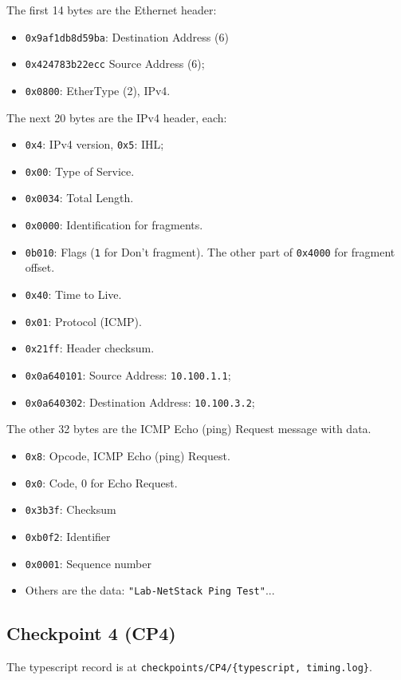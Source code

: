 \documentclass[a4paper]{article}
\begin{document}
  The first 14 bytes are the Ethernet header:
  \begin{itemize}
    \item \texttt{0x9af1db8d59ba}: Destination Address (6)
    \item \texttt{0x424783b22ecc} Source Address (6);
    \item \texttt{0x0800}: EtherType (2), IPv4.
  \end{itemize}
  The next 20 bytes are the IPv4 header, each:
  \begin{itemize}
    \item \texttt{0x4}: IPv4 version, \texttt{0x5}: IHL;
    \item \texttt{0x00}: Type of Service.
    \item \texttt{0x0034}: Total Length.
    \item \texttt{0x0000}: Identification for fragments.
    \item \texttt{0b010}: Flags (\texttt{1} for Don't fragment). The other part of \texttt{0x4000} for fragment offset.
    \item \texttt{0x40}: Time to Live.
    \item \texttt{0x01}: Protocol (ICMP).
    \item \texttt{0x21ff}: Header checksum.
    \item \texttt{0x0a640101}: Source Address: \texttt{10.100.1.1};
    \item \texttt{0x0a640302}: Destination Address: \texttt{10.100.3.2};
  \end{itemize}
  The other 32 bytes are the ICMP Echo (ping) Request message with data.
  \begin{itemize}
    \item \texttt{0x8}: Opcode, ICMP Echo (ping) Request.
    \item \texttt{0x0}: Code, 0 for Echo Request.
    \item \texttt{0x3b3f}: Checksum
    \item \texttt{0xb0f2}: Identifier
    \item \texttt{0x0001}: Sequence number
    \item Others are the data: \texttt{"Lab-NetStack Ping Test"}...
  \end{itemize}

  \subsection{Checkpoint 4 (CP4)}

  The typescript record is at \texttt{checkpoints/CP4/\{typescript, timing.log\}}.
\end{document}
